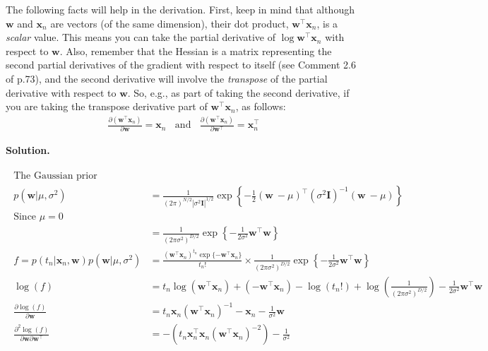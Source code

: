 \documentclass[10pt]{article}
\begin{document}
\begin{itemize}
The following facts will help in the derivation.  First, keep in mind that although $\mathbf{w}$ and $\mathbf{x}_n$ are vectors (of the same dimension), their dot product, $\mathbf{w}^\top\mathbf{x}_n$, is a {\em scalar} value.  This means you can take the partial derivative of $\log \mathbf{w}^\top\mathbf{x}_n$ with respect to $\mathbf{w}$.  Also, remember that the Hessian is a matrix representing the second partial derivatives of the gradient with respect to itself (see Comment 2.6 of p.73), and the second derivative will involve the {\em transpose} of the partial derivative with respect to $\mathbf{w}$.  So, e.g., as part of taking the second derivative, if you are taking the transpose derivative part of $\mathbf{w}^\top\mathbf{x}_n$, as follows:
\begin{eqnarray*}
\frac{\partial (\mathbf{w}^\top \mathbf{x}_n)}{\partial \mathbf{w}} = \mathbf{x}_n
~~~~\mathrm{and}~~~~
\frac{\partial (\mathbf{w}^\top \mathbf{x}_n)}{\partial \mathbf{w}^\top} = \mathbf{x}_n^\top
\end{eqnarray*}

{\bf Solution.} %

\begin{eqnarray*}
\begin{aligned}
\text{The Gaussian prior}
\\
p(\mathbf{w}|\mu, \sigma^2) &=
\frac{1}{(2 \pi)^{N/2} | \sigma^2 \mathbf{I}|^{1/2}} 
\exp 
\left\{ 
-\frac{1}{2} 
(\mathbf{w}\ - \mu)^\top 
(\sigma^2 \mathbf{I})^{-1} 
(\mathbf{w}\ - \mu)
\right\}
\\
\text{Since $\mu = 0$}
\\ 
&= \frac{1}{(2 \pi \sigma^2)^{D/2}} 
\exp 
\left\{ 
-\frac{1}{2\sigma^2} 
\mathbf{w}^\top \mathbf{w}
\right\}
\\
f = p(t_n | \mathbf{x}_n, \mathbf{w}) p(\mathbf{w}|\mu, \sigma^2)
&=\frac{(\mathbf{w}^\top\mathbf{x}_n)^{t_n} 
\exp \{ - \mathbf{w}^\top\mathbf{x}_n  \}}{t_n!} 
\times
\frac{1}{(2 \pi \sigma^2)^{D/2}} 
\exp 
\left\{ 
-\frac{1}{2\sigma^2} \mathbf{w}^\top \mathbf{w}
\right\}
\\
\log(f) &= t_n \log(\mathbf{w}^\top \mathbf{x}_n) + (-\mathbf{w}^\top \mathbf{x}_n) - \log(t_n!)
+ \log(\frac{1}{(2 \pi \sigma^2)^{D/2}}) - \frac{1}{2\sigma^2} \mathbf{w}^\top \mathbf{w}
\\
\frac{\partial \log(f)}{\partial \mathbf{w}} 
&= t_n \mathbf{x}_n (\mathbf{w}^\top \mathbf{x}_n)^{-1} - \mathbf{x}_n - \frac{1}{\sigma^2}\mathbf{w}
\\
\frac{\partial^2 \log(f)}{\partial \mathbf{w} \partial \mathbf{w}^\top } &=
-( t_n \mathbf{x}_n^\top \mathbf{x}_n ( \mathbf{w}^\top \mathbf{x}_n)^{-2}) - \frac{1}{\sigma^2}
\end{aligned}
\end{eqnarray*}


\end{itemize}
\end{document}

